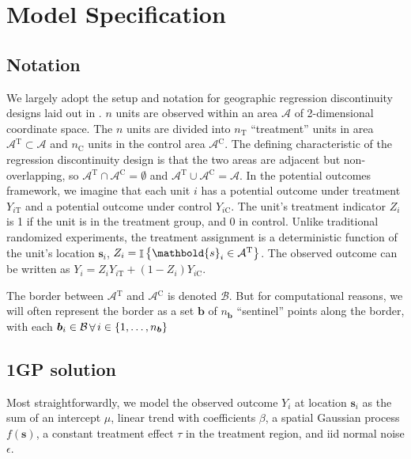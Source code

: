 \documentclass[letter]{article}
\DeclareMathOperator{\Ind}{\mathbb{I}}
\newcommand{\area}{\mathcal{A}}
\newcommand{\treat}{\mathrm{T}}
\newcommand{\ctrol}{\mathrm{C}}
\newcommand{\treatind}{Z}
\newcommand{\treatarea}{\area{}^{\treat}}
\newcommand{\ctrolarea}{\area{}^{\ctrol}}
\newcommand{\svec}{\mathbold{s}}
\newcommand{\boundary}{\mathcal{B}}
\newcommand{\sentinels}{\bm{b}}
\DeclareMathOperator{\Forall}{\forall}
\newcommand{\numsent}{n_{\sentinels}}
\renewcommand{\cite}[1]{\citep{#1}}
\begin{document}
    	\section{Model Specification}\label{model-specification}

\subsection{Notation}\label{notation}

We largely adopt the setup and notation for geographic regression discontinuity designs laid out in \cite{keele_titiunik_2015}.
\(n\) units are observed within an area \(\area\) of 2-dimensional coordinate space.
The \(n\) units are divided into \(n_\treat\) ``treatment'' units in area \(\treatarea \subset \area\)
and \(n_\ctrol\) units in the control area \(\ctrolarea\).
The defining characteristic of the regression discontinuity design is that the two areas are adjacent but non-overlapping, so \(\treatarea \cap \ctrolarea = \emptyset\) and \(\treatarea \cup \ctrolarea = \area\).
In the potential outcomes framework, we imagine that each unit \(i\) has a potential outcome under treatment \(Y_{i\treat}\) and a potential outcome under control \(Y_{i\ctrol}\).
The unit's treatment indicator \(\treatind_i\) is 1 if the unit is in the treatment group, and 0 in control.
Unlike traditional randomized experiments, the treatment assignment is a deterministic function of the unit's location \(\svec_i\), \(\treatind_i = \Ind\cbr{\svec_i \in \treatarea}\).
The observed outcome can be written as \(Y_i = \treatind_i Y_{i\treat} + (1 - \treatind_i) Y_{i\ctrol}\).

The border between \(\treatarea\) and \(\ctrolarea\) is denoted \(\boundary\).
But for computational reasons, we will often represent the border as a set \(\sentinels\) of \(\numsent\) ``sentinel'' points along the border, with each \(\sentinels_i \in \boundary \Forall i \in \cbr{1,\ldots,\numsent}\)
    


    	\subsection{1GP solution}\label{gp-solution}

Most straightforwardly, we model the observed outcome \(Y_i\) at location \(\svec_i\) as the sum of an intercept \(\mu\), linear trend with coefficients \(\beta\), a spatial Gaussian process \(f(\svec)\), a constant treatment effect \(\tau\) in the treatment region, and iid normal noise \(\epsilon\).
\end{document}
